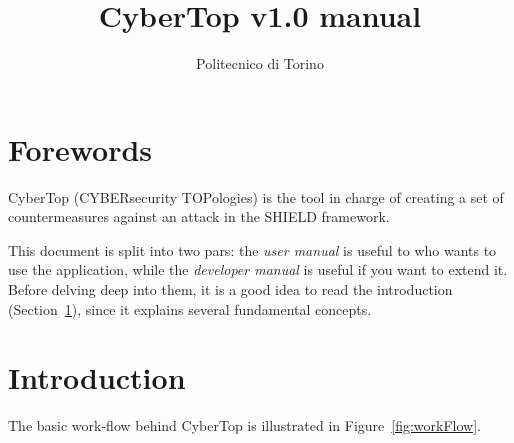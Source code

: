 \documentclass{scrartcl}
\title{CyberTop v1.0 manual}
\author{Politecnico di Torino}
\date{}
\begin{document}
\maketitle

\tableofcontents

\section*{Forewords}

CyberTop (CYBERsecurity TOPologies) is the tool in charge of creating a set of countermeasures against an attack in the SHIELD framework.

This document is split into two pars: the \emph{user manual} is useful to who wants to use the application, while the \emph{developer manual} is useful if you want to extend it. Before delving deep into them, it is a good idea to read the introduction (Section~\ref{sec:introduction}), since it explains several fundamental concepts.

\cleardoublepage
\section{Introduction}
\label{sec:introduction}

The basic work-flow behind CyberTop is illustrated in Figure~\ref{fig:workFlow}.
\end{document}
